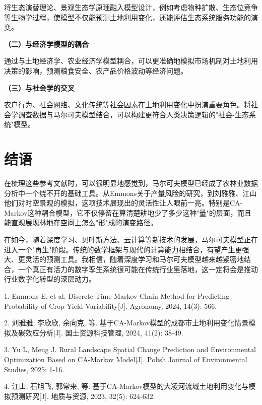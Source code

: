 \documentclass[a4paper,12pt]{ctexart}
\renewcommand*{\songti}{\CJKfamily{zhsong}}
\renewcommand*{\heiti}{\CJKfamily{zhhei}}
\begin{document}
将生态演替理论、景观生态学原理融入模型设计，例如考虑物种扩散、生态位竞争等生物学过程，使模型不仅能预测土地利用变化，还能评估生态系统服务功能的演变。

\textbf{（二）与经济学模型的耦合}

通过与土地经济学、农业经济学模型耦合，可以更准确地模拟市场机制对土地利用决策的影响，预测粮食安全、农产品价格波动等经济问题。

\textbf{（三）与社会学的交叉}

农户行为、社会网络、文化传统等社会因素在土地利用变化中扮演重要角色。将社会学调查数据与马尔可夫模型结合，可以构建更符合人类决策逻辑的"社会-生态系统"模型。

\section{结语}

在梳理这些参考文献时，可以很明显地感觉到，马尔可夫模型已经成了农林业数据分析中一个绕不开的基础工具。从Emmons关于产量风险的研究，到刘雅雅、江山他们对时空景观的模拟，这项技术展现出的灵活性让人眼前一亮。特别是CA-Markov这种耦合模型，它不仅停留在算清楚耕地少了多少这种"量"的层面，而且能直观展现林地在空间上怎么"形"成的演变路径。

在如今，随着深度学习、贝叶斯方法、云计算等新技术的发展，马尔可夫模型正在进入一个"再生"阶段。传统的数学框架与现代的计算能力相结合，有望产生更强大、更灵活的预测工具。我相信，随着深度学习和马尔可夫模型越来越紧密地结合，一个真正有活力的数字孪生系统很可能在传统行业里落地，这一定将会是推动行业数字化转型的深层动力。


\vspace{2em}
{} 
\noindent {\zihao{5}\heiti \textbf{参考文献：}}

\begingroup
    \songti
    \setlength{\baselineskip}{23pt}
    
    1. Emmons E, et al. Discrete-Time Markov Chain Method for Predicting Probability of Crop Yield Variability[J]. Agronomy, 2024, 14(3): 566.
    
    2. 刘雅雅, 李欣欣, 余向克, 等. 基于CA-Markov模型的成都市土地利用变化情景模拟及碳效应分析[J]. 国土资源科技管理, 2024, 41(2): 38-49.
    
    3. Yu L, Meng J. Rural Landscape Spatial Change Prediction and Environmental Optimization Based on CA-Markov Model[J]. Polish Journal of Environmental Studies, 2025: 1-16.
    
    4. 江山, 石旭飞, 郭常来, 等. 基于CA-Markov模型的大凌河流域土地利用变化与模拟预测研究[J]. 地质与资源, 2023, 32(5): 624-632.
\endgroup
\end{document}
